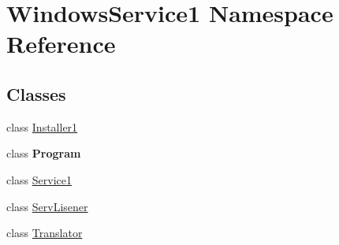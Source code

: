 \hypertarget{namespace_windows_service1}{}\section{Windows\+Service1 Namespace Reference}
\label{namespace_windows_service1}
\subsection*{Classes}
\begin{DoxyCompactItemize}
\item 
class \hyperlink{class_windows_service1_1_1_installer1}{Installer1}
\item 
class {\bfseries Program}
\item 
class \hyperlink{class_windows_service1_1_1_service1}{Service1}
\item 
class \hyperlink{class_windows_service1_1_1_serv_lisener}{Serv\+Lisener}
\item 
class \hyperlink{class_windows_service1_1_1_translator}{Translator}
\end{DoxyCompactItemize}
